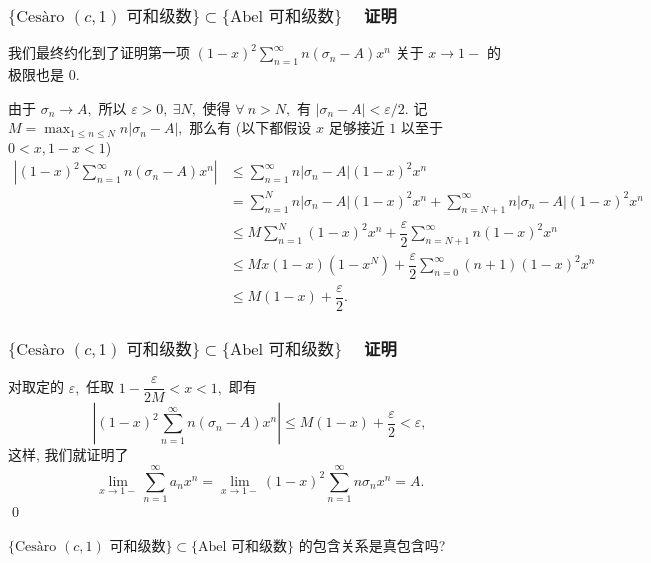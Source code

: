 \begin{frame}
\frametitle{$\{ \text{Cesàro $(c, 1)$ 可和级数} \} \subset \{ \text{Abel 可和级数} \}$ ~ 证明}

我们最终约化到了证明第一项 $\displaystyle (1-x)^2 \sum_{n=1}^{\infty} n (\sigma_n - A) x^n$ 关于 $x \to 1-$ 的极限也是 $0.$

由于 $\sigma_n \to A,$ 所以 $\varepsilon > 0, ~ \exists N,$ 使得 $\forall~n > N,$ 有 $|\sigma_n - A| < \varepsilon / 2.$ 记 $\displaystyle M = \max_{1 \leqslant n \leqslant N} n |\sigma_n - A|,$ 那么有 (以下都假设 $x$ 足够接近 $1$ 以至于 $0 < x, 1-x < 1$)
\begin{align*}
\left\lvert (1-x)^2 \sum_{n=1}^{\infty} n (\sigma_n - A) x^n \right\rvert & \leqslant \sum_{n=1}^{\infty} n |\sigma_n - A| (1-x)^2x^n \\
& = \sum_{n=1}^{N} n |\sigma_n - A| (1-x)^2x^n + \sum_{n=N+1}^{\infty} n |\sigma_n - A|(1-x)^2x^n \\
& \leqslant M \sum_{n=1}^{N} (1-x)^2x^n + \dfrac{\varepsilon}{2} \sum_{n=N+1}^{\infty} n (1-x)^2x^n \\
& \leqslant M x(1-x)(1-x^N) + \dfrac{\varepsilon}{2} \sum_{n=0}^{\infty} (n + 1) (1-x)^2x^n \\
& \leqslant M(1 - x) + \dfrac{\varepsilon}{2}.
\end{align*}

\end{frame}


\begin{frame}
\frametitle{$\{ \text{Cesàro $(c, 1)$ 可和级数} \} \subset \{ \text{Abel 可和级数} \}$ ~ 证明}

对取定的 $\varepsilon,$ 任取 $1 - \dfrac{\varepsilon}{2M} < x < 1,$ 即有
\[
\left\lvert (1-x)^2 \sum_{n=1}^{\infty} n (\sigma_n - A) x^n \right\rvert \leqslant M(1 - x) + \dfrac{\varepsilon}{2} < \varepsilon,
\]
这样, 我们就证明了
\[
\lim_{x\to 1-} \sum_{n=1}^{\infty} a_n x^n = \lim_{x\to 1-} (1-x)^2 \sum_{n=1}^{\infty} n \sigma_n x^n = A.
\]
\qed

\pause
\vspace{0.5em}

\begin{question}
$\{ \text{Cesàro $(c, 1)$ 可和级数} \} \subset \{ \text{Abel 可和级数} \}$ 的包含关系是真包含吗?
\end{question}

\end{frame}

